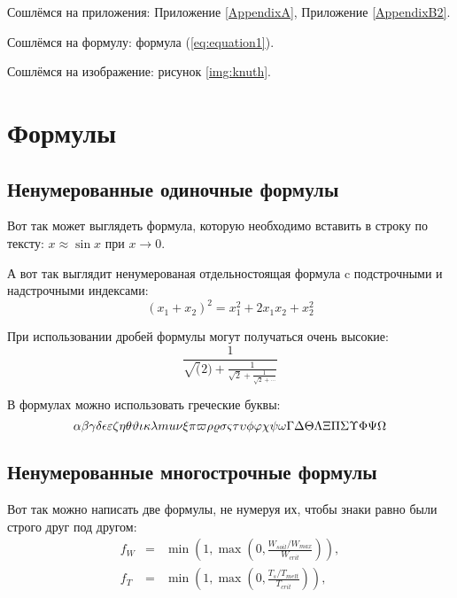 Сошлёмся на приложения: Приложение \ref{AppendixA}, Приложение \ref{AppendixB2}.

Сошлёмся на формулу: формула (\ref{eq:equation1}).

Сошлёмся на изображение: рисунок \ref{img:knuth}.


\section{Формулы} \label{sect1_3}

\subsection{Ненумерованные одиночные формулы} \label{subsect1_3_1}

Вот так может выглядеть формула, которую необходимо вставить в строку по тексту: $x \approx \sin x$ при $x \to 0$.

А вот так выглядит ненумерованая отдельностоящая формула c подстрочными и надстрочными индексами:
$$
(x_1+x_2)^2 = x_1^2 + 2 x_1 x_2 + x_2^2
$$

При использовании дробей формулы могут получаться очень высокие:
$$
  \frac{1}{\sqrt(2)+
  \displaystyle\frac{1}{\sqrt{2}+
  \displaystyle\frac{1}{\sqrt{2}+\cdots}}}
$$

В формулах можно использовать греческие буквы:
$$
\alpha\beta\gamma\delta\epsilon\varepsilon\zeta\eta\theta\vartheta\iota\kappa\lambda\\mu\nu\xi\pi\varpi\rho\varrho\sigma\varsigma\tau\upsilon\phi\varphi\chi\psi\omega\Gamma\Delta\Theta\Lambda\Xi\Pi\Sigma\Upsilon\Phi\Psi\Omega
$$


\subsection{Ненумерованные многострочные формулы} \label{subsect1_3_2}

Вот так можно написать две формулы, не нумеруя их, чтобы знаки равно были строго друг под другом:
\begin{eqnarray}
  f_W & = & \min \left( 1, \max \left( 0, \frac{W_{soil} / W_{max}}{W_{crit}} \right)  \right), \nonumber \\
  f_T & = & \min \left( 1, \max \left( 0, \frac{T_s / T_{melt}}{T_{crit}} \right)  \right), \nonumber
\end{eqnarray}

